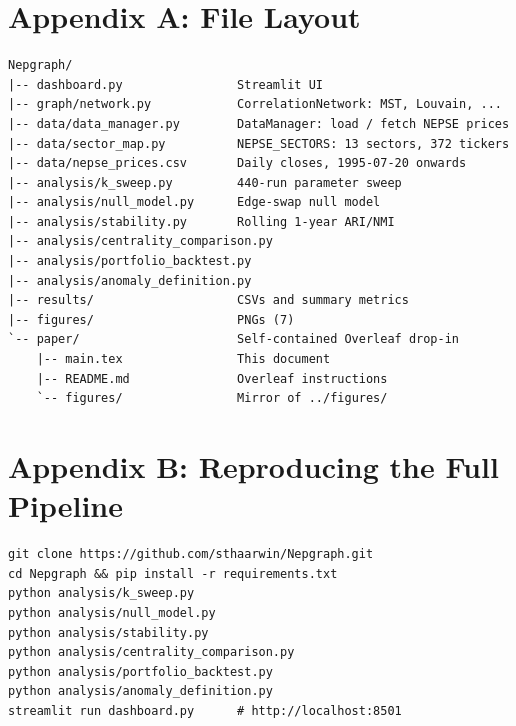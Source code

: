\documentclass[11pt,a4paper]{article}
\theoremstyle{definition}
\begin{document}
\appendix
\newpage
\section*{Appendix A: File Layout}
\begin{verbatim}
Nepgraph/
|-- dashboard.py                Streamlit UI
|-- graph/network.py            CorrelationNetwork: MST, Louvain, ...
|-- data/data_manager.py        DataManager: load / fetch NEPSE prices
|-- data/sector_map.py          NEPSE_SECTORS: 13 sectors, 372 tickers
|-- data/nepse_prices.csv       Daily closes, 1995-07-20 onwards
|-- analysis/k_sweep.py         440-run parameter sweep
|-- analysis/null_model.py      Edge-swap null model
|-- analysis/stability.py       Rolling 1-year ARI/NMI
|-- analysis/centrality_comparison.py
|-- analysis/portfolio_backtest.py
|-- analysis/anomaly_definition.py
|-- results/                    CSVs and summary metrics
|-- figures/                    PNGs (7)
`-- paper/                      Self-contained Overleaf drop-in
    |-- main.tex                This document
    |-- README.md               Overleaf instructions
    `-- figures/                Mirror of ../figures/
\end{verbatim}

\newpage
\section*{Appendix B: Reproducing the Full Pipeline}
\begin{verbatim}
git clone https://github.com/sthaarwin/Nepgraph.git
cd Nepgraph && pip install -r requirements.txt
python analysis/k_sweep.py
python analysis/null_model.py
python analysis/stability.py
python analysis/centrality_comparison.py
python analysis/portfolio_backtest.py
python analysis/anomaly_definition.py
streamlit run dashboard.py      # http://localhost:8501
\end{verbatim}


\end{document}

